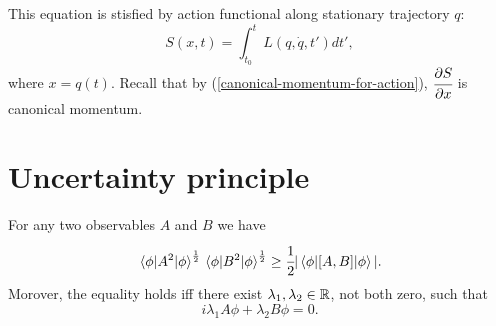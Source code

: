 \documentclass[main.tex]{subfiles}
\begin{document}
This equation is stisfied by action functional along stationary trajectory $q$:
\begin{equation}
S(x, t) = \int^t_{t_0} L(q, \dot{q}, t') dt',
\end{equation}
where $x = q(t)$.
Recall that by (\ref{canonical-momentum-for-action}), $\cfrac{\partial S}{\partial x}$ is canonical momentum.
\section{Uncertainty principle}
\begin{lemma}
For any two observables $A$ and $B$ we have
\begin{equation}
\label{uncertainty-inequality}
\mel{\phi}{A^2}{\phi}^{\frac{1}{2}} \mel{\phi}{B^2}{\phi}^{\frac{1}{2}} \geq \cfrac{1}{2} |\mel{\phi}{[A,B]}{\phi}|.
\end{equation}
Morover, the equality holds iff there exist $\lambda_1, \lambda_2\in \mathbb{R}$, not both zero, such that 
\begin{equation}
\label{uncertainty-linear-condition}
i\lambda_1 A\phi + \lambda_2 B\phi = 0.
\end{equation}
\end{lemma}
\end{document}

